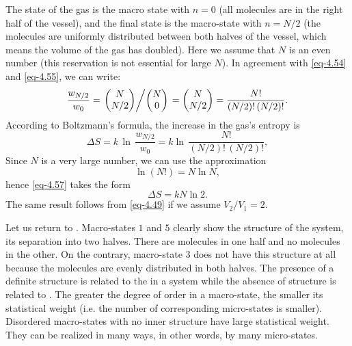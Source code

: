 The  state of the gas is the macro state with $n = 0$ (all molecules are in the right half of the vessel), and the final state is the macro-state with $n = N /2$ (the molecules are uniformly distributed	between both halves of the vessel, which means the volume of the gas has doubled). Here we assume that $N$ is an even number (this reservation is not essential for large $N$). In agreement with \eqref{eq-4.54} and \eqref{eq-4.55}, we can write:
\begin{equation}%
\frac{w_{N/2}}{w_{0}} = \left. \begin{pmatrix}
N\\ N/2
\end{pmatrix} \middle/  \begin{pmatrix}
N\\ 0
\end{pmatrix} \right.
= \begin{pmatrix}
N\\ N/2
\end{pmatrix} = \frac{N!}{(N/2)! \, (N/2)!}.
\label{eq-4.56}
\end{equation}
According to Boltzmann's formula, the increase in the gas's entropy is
\begin{equation}%
\Delta S = k \, \ln \,\frac{w_{N/2}}{w_{0}} = k \ln \, \frac{N!}{(N/2)! \, (N/2)!},
\label{eq-4.57}
\end{equation}
Since $N$ is a very large number, we can use the approximation
\begin{equation}%
\ln (N!) = N \ln N,
\label{eq-4.58}
\end{equation}
hence \eqref{eq-4.57} takes the form 
\begin{equation}%
\Delta S = k N \ln 2.
\label{entropy-4}
\end{equation}
The same result follows from \eqref{eq-4.49} if we assume $V_{2} / V_{1} = 2$. 

 Let us return to . Macro-states $\mathit{1}$ and $\mathit{5}$ clearly show the structure of the system, its separation into two halves. There are molecules in one half and no molecules in the other. On the contrary, macro-state $\mathit{3}$ does not have this structure at all because the molecules are evenly distributed in both halves. The presence of a definite structure is related to the  in a system while the absence of structure is related to . The greater the degree of order in a macro-state, the smaller its statistical weight (i.e. the number of corresponding micro-states is smaller). Disordered macro-states with no inner structure have large statistical weight. They can be realized in many ways, in other words, by many micro-states.

